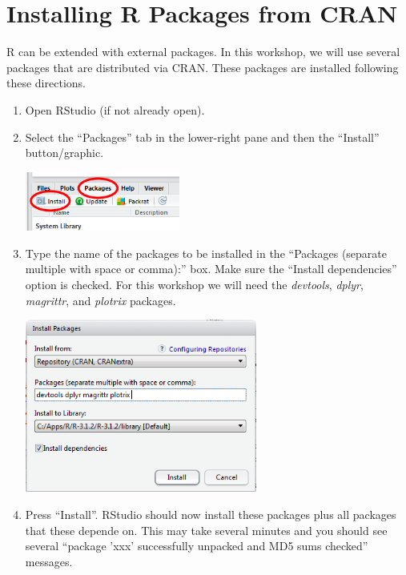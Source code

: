 \documentclass{article}\usepackage[]{graphicx}\usepackage[]{color}
\begin{document}
\newpage
\section{Installing R Packages from CRAN}
R can be extended with external packages.  In this workshop, we will use several packages that are distributed via CRAN.  These packages are installed following these directions.
\begin{enumerate}
  \item Open RStudio (if not already open).

  \item Select the ``Packages'' tab in the lower-right pane and then the ``Install'' button/graphic.
\begin{center}
  \includegraphics[width=2in]{Figs/RStudio_Prep_InstallPkgs_Icons.png}
\end{center}

  \item Type the name of the packages to be installed in the ``Packages (separate multiple with space or comma):'' box.  Make sure the ``Install dependencies'' option is checked.  For this workshop we will need the \textit{devtools}, \textit{dplyr}, \textit{magrittr}, and \textit{plotrix} packages.
\begin{center}
  \includegraphics[width=3in]{Figs/RStudio_Prep_InstallPkgs_Choose.png}
\end{center}
  \item Press ``Install''.  RStudio should now install these packages plus all packages that these depende on.  This may take several minutes and you should see several ``package 'xxx' successfully unpacked and MD5 sums checked'' messages.
\end{enumerate}
\end{document}
